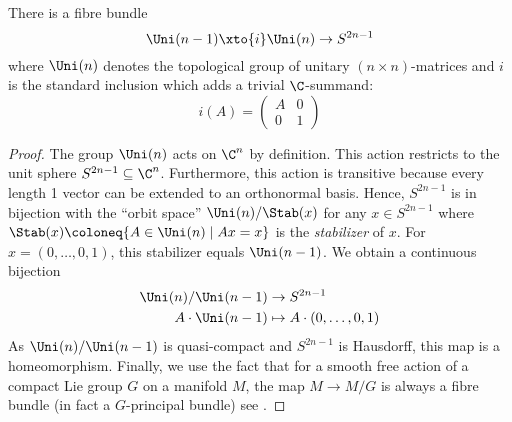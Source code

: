 \begin{lemma}
	There is a fibre bundle
	\begin{equation*}
		\Uni(n - 1) \xto{i} \Uni(n) \to S^{2n - 1}
	\end{equation*}
	where $\Uni(n)$ denotes the topological group of unitary $(n \times n)$-matrices and $i$ is the standard inclusion which adds a trivial $\C$-summand:
	\begin{equation*}
		i(A) = \begin{pmatrix}
			A & 0 \\
			0 & 1
		\end{pmatrix}
	\end{equation*}
\end{lemma}
\begin{proof}
	The group $\Uni(n)$ acts on $\C^n$ by definition.
	This action restricts to the unit sphere $S^{2n - 1} \subseteq \C^n$.
	Furthermore, this action is transitive because every length 1 vector can be extended to an orthonormal basis.
	Hence, $S^{2n - 1}$ is in bijection with the \enquote{orbit space} $\Uni(n) / \Stab(x)$ for any $x \in S^{2n - 1}$ where $\Stab(x) \coloneq \{A \in \Uni(n) \mid Ax = x\}$ is the \emph{stabilizer} of $x$.
	For $x = (0, \ldots, 0, 1)$, this stabilizer equals $\Uni(n - 1)$.
	We obtain a continuous bijection
	\begin{align*}
		\Uni(n) / \Uni(n - 1) &\to S^{2n - 1} \\
		A \cdot \Uni(n - 1) &\mapsto A \cdot (0, \ldots, 0, 1)
	\end{align*}
	As $\Uni(n) / \Uni(n - 1)$ is quasi-compact and $S^{2n - 1}$ is Hausdorff, this map is a homeomorphism.
	Finally, we use the fact that for a smooth free action of a compact Lie group $G$ on a manifold $M$, the map $M \to M / G$ is always a fibre bundle (in fact a $G$-principal bundle) see \cite[Problem 21-6]{lee_introduction_2012}.
\end{proof}
